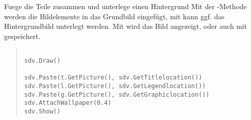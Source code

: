 Fuege die Teile zusammen und unterlege einen Hintergrund Mit der
-Methode  werden die Bildelemente in
das Grundbild eingef\"ugt, mit  kann ggf.
das Hintergrundbild unterlegt werden.  Mit  wird das
Bild angezeigt, oder auch mit  gespeichert.

\begin{small}
\begin{quote}
\begin{verbatim}

sdv.Draw()

sdv.Paste(t.GetPicture(), sdv.GetTitlelocation())
sdv.Paste(l.GetPicture(), sdv.GetLegendlocation())
sdv.Paste(g.GetPicture(), sdv.GetGraphiclocation())
sdv.AttachWallpaper(0.4)
sdv.Show()

\end{verbatim}
\end{quote}
\end{small}
